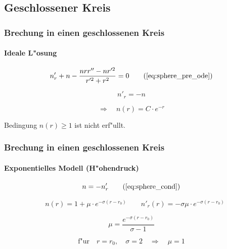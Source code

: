 \documentclass{beamer}
\begin{document}
\begin{frame}
\begin{center}
    \end{center}
    
  \end{frame}
  
  \subsection{Geschlossener Kreis}
  \begin{frame}
    \frametitle{Brechung in einen geschlossenen Kreis}
    \framesubtitle{Ideale L"osung}

    \begin{equation*}
      n'_r + n - \frac{nrr''-nr'^2}{r'^2 + r^2} = 0 \tag{\ref{eq:sphere_pre_ode}}
    \end{equation*}        
      
    \begin{equation} \label{eq:sphere_cond}
      n'_r = -n
    \end{equation} 
    
    $$\Rightarrow \quad n(r) = C \cdot e^{-r}$$
    \begin{center}
      Bedingung $n(r) \geq 1$ ist nicht erf"ullt.  
    \end{center}    
    
  \end{frame}    
  
  \begin{frame}
    \frametitle{Brechung in einen geschlossenen Kreis}
    \framesubtitle{Exponentielles Modell (H"ohendruck)}
    
    \begin{equation*}
      n = -n'_r  \tag{\ref{eq:sphere_cond}}  
    \end{equation*}    
    
    $$\quad n(r)=1 + \mu \cdot e^{-\sigma (r - r_0)} \qquad n'_r(r) = -\sigma \mu \cdot e^{-\sigma (r-r_0)}$$
    
    $$\mu = \frac{e^{-\sigma (r - r_0)}}{\sigma - 1}$$
    
    $$\text{f"ur} \quad r = r_0, \quad \sigma = 2 \quad \Rightarrow \quad \mu = 1$$
  \end{frame}
  
\end{document}
